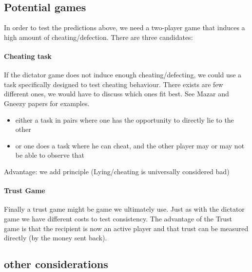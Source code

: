 \documentclass[11pt]{article}
\theoremstyle{plainCl1}
\begin{document}
\subsection{Potential games}
In order to test the predictions above, we need a two-player game that induces a high amount of cheating/defection. There are three candidates:

\paragraph{Cheating task}

If the dictator game does not induce enough cheating/defecting, we could use a task specifically designed to test cheating behaviour. 
There exists are few different ones, we would have to discuss which ones fit best. See Mazar and Gneezy papers for examples. \\
\begin{itemize}
    \item either a task in pairs where one has the opportunity to directly lie to the other
    \item or one does a task where he can cheat, and the other player may or may not be able to observe that
\end{itemize}
Advantage: we add principle (Lying/cheating is universally considered bad)\\

\paragraph{Trust Game}

Finally a trust game might be game we ultimately use. Just as with the dictator game we have different costs to test consistency. 
The advantage of the Trust game is that the recipient is now an active player and that trust can be measured directly (by the money sent back). 

\subsection{other considerations}
\end{document}
